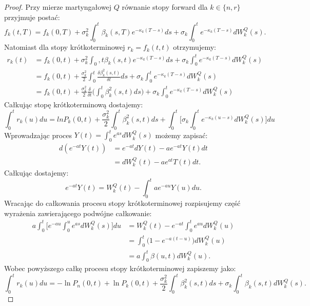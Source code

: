 \documentclass{mini}
\theoremstyle{mythstyle}
\begin{document}
	\begin{proof}
	Przy mierze martyngałowej $Q$ równanie stopy forward dla $k \in \{n, r\}$ przyjmuje postać:
	\begin{equation}
		f_k(t,T) = f_k(0,T) + \sigma_k^2 \int_0^t \beta_k(s,T)e^{-\kappa_k(T-s)}ds + \sigma_k \int_0^t e^{-\kappa_k(T-s)}dW_k^Q(s).
	\end{equation}
	Natomiast dla stopy krótkoterminowej $r_k = f_k(t, t)$ otrzymujemy:
	\begin{align*}
		r_k(t) &= f_k(0,t) + \sigma_k^2 \int_0,t \beta_k(s,t) e^{-\kappa_k(T-s)}ds + \sigma_k \int_0^t e^{-\kappa_k(T-s)}dW_k^Q(s)\\
		&= f_k(0,t) + \frac{\sigma_k^2}{2} \int_0^t \frac{\delta\beta_k^2(s,t)}{\delta t}ds + \sigma_k\int_0^t e^{-\kappa_k(T-s)}dW_k^Q(s)\\
		&= f_k(0,t) + \frac{\sigma_k^2}{2}\frac{\delta}{\delta t} \bigg(\int_0^t\beta_k^2(s, t)ds\bigg) + \sigma_k\int_0^t e^{-\kappa_k(T-s)}dW_k^Q(s)
	\end{align*}
	Całkując stopę krótkoterminową dostajemy:
	\begin{equation}
		\int_{0}^{t} r_k(u) du = ln P_k(0,t) + \frac{\sigma_k^2}{2} \int_{0}^{t} \beta^2_k(s,t) ds + \int_{0}^{t}\bigg[ \sigma_k \int_{0}^{t} e^{-\kappa_k(u-s)}dW_k^Q(s)\bigg] du
	\end{equation}
	Wprowadzając proces $Y(t) = \int_{0}^{t}e^{as}dW_k^Q(s)$ możemy zapisać:
	\begin{align}
		d(e^{-at}Y(t)) &= e^{-at}dY(t) - ae^{-at}Y(t)dt \\
		&= dW_k^Q(t) - ae^{at}T(t)dt.
	\end{align}
	Całkując dostajemy:
	\begin{equation}
		e^{-at}Y(t) = W_k^Q(t) - \int_{0}^{t} ae^{-au}Y(u) du.
	\end{equation}
	Wracając do całkowania procesu stopy krótkoterminowej rozpisujemy część wyrażenia zawierającego podwójne całkowanie:
	\begin{align*}
		a\int_{0}^{t} \bigg[ e^{-au} \int_{0}^{u} e^{as}dW_k^Q(s) \bigg]du &= W_k^Q(t) - e^{-at}\int_{0}^{t} e^{au} dW_k^Q(u) \\
		&= \int_{0}^{t} \bigg( 1 - e^{-a(t-u)}\bigg) dW_k^Q(u) \\
		&= a \int_{0}^{t} \beta(u,t)dW_k^Q(u).
	\end{align*}
	Wobec powyższego całkę procesu stopy krótkoterminowej zapiszemy jako:
	\begin{equation}
		\int_{0}^{t} r_k(u) du = -\ln P_n(0,t) + \ln P_k(0,t) + \frac{\sigma_k^2}{2} \int_{0}^{t} \beta^2_k(s,t) ds + \sigma_k \int_{0}^{t} \beta_k(s,t) dW_k^Q(s).

\end{equation}
\end{proof}
\end{document}
